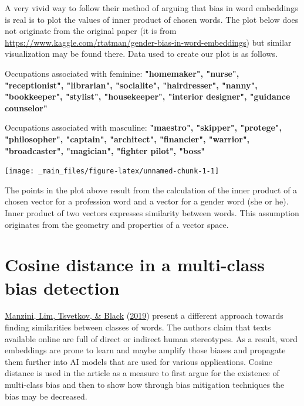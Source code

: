 \documentclass[
  12pt,
]{book}
\begin{document}
A very vivid way to follow their method of arguing that bias in word embeddings is real is to plot the values of inner product of chosen words. The plot below does not originate from the original paper (it is from \url{https://www.kaggle.com/rtatman/gender-bias-in-word-embeddings}) but similar visualization may be found there. Data used to create our plot is as follows.

Occupations associated with feminine: \textbf{"homemaker", "nurse", "receptionist", "librarian", "socialite", "hairdresser", "nanny", "bookkeeper", "stylist", "housekeeper", "interior designer", "guidance counselor"}

Occupations associated with masculine: \textbf{"maestro", "skipper", "protege", "philosopher", "captain", "architect", "financier", "warrior", "broadcaster", "magician", "fighter pilot", "boss"}

\vspace{1mm}
\footnotesize

\begin{center}\texttt{[image: \_main\_files/figure-latex/unnamed-chunk-1-1]} \end{center}
\normalsize

The points in the plot above result from the calculation of the inner product of a chosen vector for a profession word and a vector for a gender word (she or he). Inner product of two vectors expresses similarity between words. This assumption originates from the geometry and properties of a vector space.

\hypertarget{cosine-distance-in-a-multi-class-bias-detection}{%
\section{Cosine distance in a multi-class bias detection}\label{cosine-distance-in-a-multi-class-bias-detection}}

\protect\hyperlink{ref-Manzini2019blackToCriminal}{Manzini, Lim, Tsvetkov, \& Black} (\protect\hyperlink{ref-Manzini2019blackToCriminal}{2019}) present a different approach towards finding similarities between classes of words. The authors claim that texts available online are full of direct or indirect human stereotypes. As a result, word embeddings are prone to learn and maybe amplify those biases and propagate them further into AI models that are used for various applications. Cosine distance is used in the article as a measure to first argue for the existence of multi-class bias and then to show how through bias mitigation techniques the bias may be decreased.
\end{document}
